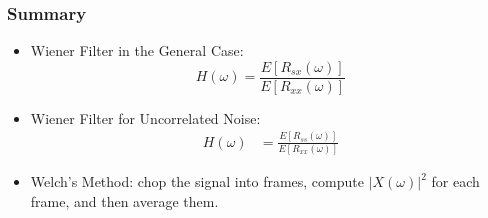 \documentclass{beamer}
\begin{document}
\begin{frame}
  \frametitle{Summary}
  \begin{itemize}
    \item Wiener Filter in the General Case:
      \begin{displaymath}
        H(\omega) =\frac{E\left[R_{sx}(\omega)\right]}{E\left[R_{xx}(\omega)\right]}
      \end{displaymath}
    \item Wiener Filter for Uncorrelated Noise:
      \begin{align*}
        H(\omega)
        &=\frac{E\left[R_{ss}(\omega)\right]}{E\left[R_{xx}(\omega)\right]}
      \end{align*}
    \item Welch's Method:
      chop the signal into frames, compute $|X(\omega)|^2$ for each frame, and then average them.
  \end{itemize}
\end{frame}
\end{document}
